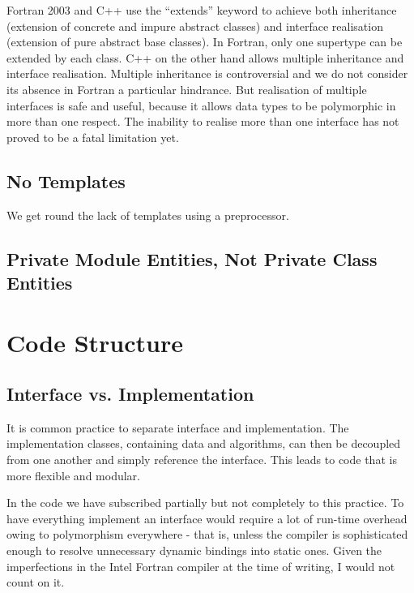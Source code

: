 \documentclass[dvips, 11pt, a4paper]{article}
\begin{document}
Fortran 2003 and C++ use the ``extends'' keyword to achieve both
inheritance (extension of concrete and impure abstract classes) and
interface realisation (extension of pure abstract base classes).  In
Fortran, only one supertype can be extended by each class.  C++ on the
other hand allows multiple inheritance and interface realisation.
Multiple inheritance is controversial and we do not consider its
absence in Fortran a particular hindrance.  But realisation of
multiple interfaces is safe and useful, because it allows data types
to be polymorphic in more than one respect.  The inability to realise
more than one interface has not proved to be a fatal limitation yet.

\subsection{No Templates}
\label{sec:NoTemplatesGenerics}

We get round the lack of templates using a preprocessor.


\subsection{Private Module Entities, Not Private Class Entities}
\label{sec:PrivateModuleEntitiesNotPrivateClassEntities}




\section{Code Structure}
\label{sec:CodeStructure}

\subsection{Interface vs. Implementation}
\label{sec:InterfaceVsImplementation}

It is common practice to separate interface and
implementation.  The implementation classes, containing data and
algorithms, can then be decoupled from one another and simply
reference the interface.  This leads to code that is more flexible and
modular.

In the code we have subscribed partially but not completely to this
practice.  To have everything implement an interface would require a
lot of run-time overhead owing to polymorphism everywhere - that is,
unless the compiler is sophisticated enough to resolve unnecessary
dynamic bindings into static ones.  Given the imperfections in the
Intel Fortran compiler at the time of writing, I would not count on it.
\end{document}
